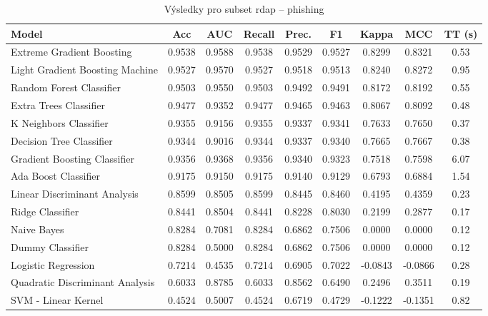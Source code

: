 \begin{table}[H]
  \centering
  \small
  \caption{Výsledky pro subset rdap – phishing}
  \begin{tabular}{|l|c|c|c|c|c|c|c|c|}
    \hline
    \textbf{Model} & \textbf{Acc} & \textbf{AUC} & \textbf{Recall} & \textbf{Prec.} & \textbf{F1} & \textbf{Kappa} & \textbf{MCC} & \textbf{TT (s)} \\
    \hline
    Extreme Gradient Boosting & 0.9538 & 0.9588 & 0.9538 & 0.9529 & 0.9527 & 0.8299 & 0.8321 & 0.53 \\
    Light Gradient Boosting Machine & 0.9527 & 0.9570 & 0.9527 & 0.9518 & 0.9513 & 0.8240 & 0.8272 & 0.95 \\
    Random Forest Classifier & 0.9503 & 0.9550 & 0.9503 & 0.9492 & 0.9491 & 0.8172 & 0.8192 & 0.55 \\
    Extra Trees Classifier & 0.9477 & 0.9352 & 0.9477 & 0.9465 & 0.9463 & 0.8067 & 0.8092 & 0.48 \\
    K Neighbors Classifier & 0.9355 & 0.9156 & 0.9355 & 0.9337 & 0.9341 & 0.7633 & 0.7650 & 0.37 \\
    Decision Tree Classifier & 0.9344 & 0.9016 & 0.9344 & 0.9337 & 0.9340 & 0.7665 & 0.7667 & 0.38 \\
    Gradient Boosting Classifier & 0.9356 & 0.9368 & 0.9356 & 0.9340 & 0.9323 & 0.7518 & 0.7598 & 6.07 \\
    Ada Boost Classifier & 0.9175 & 0.9150 & 0.9175 & 0.9140 & 0.9129 & 0.6793 & 0.6884 & 1.54 \\
    Linear Discriminant Analysis & 0.8599 & 0.8505 & 0.8599 & 0.8445 & 0.8460 & 0.4195 & 0.4359 & 0.23 \\
    Ridge Classifier & 0.8441 & 0.8504 & 0.8441 & 0.8228 & 0.8030 & 0.2199 & 0.2877 & 0.17 \\
    Naive Bayes & 0.8284 & 0.7081 & 0.8284 & 0.6862 & 0.7506 & 0.0000 & 0.0000 & 0.12 \\
    Dummy Classifier & 0.8284 & 0.5000 & 0.8284 & 0.6862 & 0.7506 & 0.0000 & 0.0000 & 0.12 \\
    Logistic Regression & 0.7214 & 0.4535 & 0.7214 & 0.6905 & 0.7022 & -0.0843 & -0.0866 & 0.28 \\
    Quadratic Discriminant Analysis & 0.6033 & 0.8785 & 0.6033 & 0.8562 & 0.6490 & 0.2496 & 0.3511 & 0.19 \\
    SVM - Linear Kernel & 0.4524 & 0.5007 & 0.4524 & 0.6719 & 0.4729 & -0.1222 & -0.1351 & 0.82 \\
    \hline
  \end{tabular}
\end{table}
\vspace{0.5cm}

